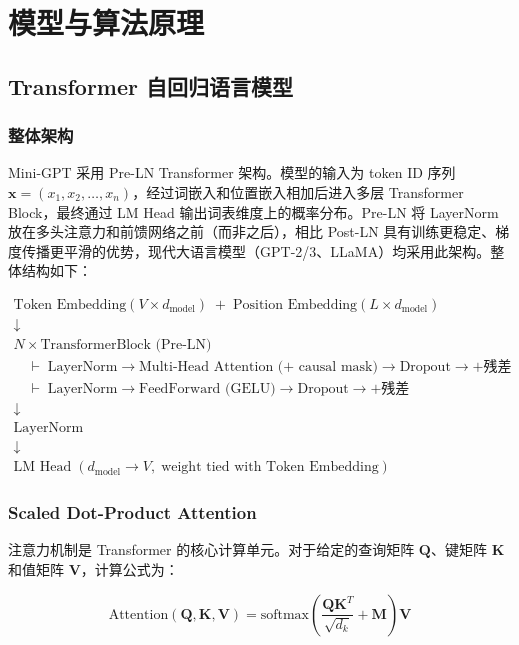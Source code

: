 \documentclass[a4paper, 12pt, centering, AutoFakeBold]{article}
\begin{document}
\section{模型与算法原理}

\subsection{Transformer 自回归语言模型}

\subsubsection{整体架构}

Mini-GPT 采用 Pre-LN Transformer 架构。模型的输入为 token ID 序列 $\mathbf{x} = (x_1, x_2, \ldots, x_n)$，经过词嵌入和位置嵌入相加后进入多层 Transformer Block，最终通过 LM Head 输出词表维度上的概率分布。Pre-LN 将 LayerNorm 放在多头注意力和前馈网络之前（而非之后），相比 Post-LN 具有训练更稳定、梯度传播更平滑的优势，现代大语言模型（GPT-2/3、LLaMA）均采用此架构。整体结构如下：

\[
\begin{array}{c}
\text{Token Embedding}(V \times d_{\text{model}}) \;+\; \text{Position Embedding}(L \times d_{\text{model}}) \\
\downarrow \\
N \times \text{TransformerBlock (Pre-LN)} \\
\quad\vdash\; \text{LayerNorm} \to \text{Multi-Head Attention (+ causal mask)} \to \text{Dropout} \to \text{+残差} \\
\quad\vdash\; \text{LayerNorm} \to \text{FeedForward (GELU)} \to \text{Dropout} \to \text{+残差} \\
\downarrow \\
\text{LayerNorm} \\
\downarrow \\
\text{LM Head}\;(d_{\text{model}} \to V,\;\text{weight tied with Token Embedding})
\end{array}
\]

\subsubsection{Scaled Dot-Product Attention}

注意力机制是 Transformer 的核心计算单元。对于给定的查询矩阵 $\mathbf{Q}$、键矩阵 $\mathbf{K}$ 和值矩阵 $\mathbf{V}$，计算公式为：

\begin{equation} \label{eq:attention}
\text{Attention}(\mathbf{Q}, \mathbf{K}, \mathbf{V}) = \text{softmax}\left(\frac{\mathbf{Q}\mathbf{K}^T}{\sqrt{d_k}} + \mathbf{M}\right)\mathbf{V}
\end{equation}
\end{document}
